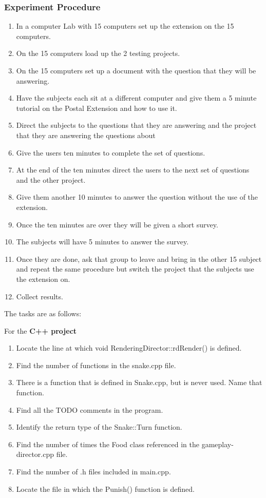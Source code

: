 \documentclass[letterpaper,10pt,titlepage,draftclsnofoot,onecolumn,onesided] {IEEEtran}
\begin{document}
	\subsubsection{Experiment Procedure}
	\begin{enumerate}
		\item	In a computer Lab with 15 computers set up the extension on the 15 computers.
		\item	On the 15 computers load up the 2 testing projects.
		\item	On the 15 computers set up a document with the question that they will be answering.
		\item	Have the subjects each sit at a different computer and give them a 5 minute tutorial on the Postal Extension and how to use it.
		\item	Direct the subjects to the questions that they are answering and the project that they are answering the questions about
		\item	Give the users ten minutes to complete the set of questions.
		\item	At the end of the ten minutes direct the users to the next set of questions and the other project. 
		\item 	Give them another 10 minutes to answer the question without the use of the extension.
		\item	Once the ten minutes are over they will be given a short survey. 
		\item	The subjects will have 5 minutes to answer the survey.
		\item	Once they are done, ask that group to leave and bring in the other 15 subject and repeat the same procedure but switch the project that the subjects use the extension on. 
		\item 	Collect results.
	\end{enumerate}
	
	The tasks are as follows: 
	
	For the \textbf{C++ project}
	\begin{enumerate}
		\item Locate the line at which void RenderingDirector::rdRender() is defined. 
		\item Find the number of functions in the snake.cpp file.
		\item There is a function that is defined in Snake.cpp, but is never used. Name that function.
		\item Find all the TODO comments in the program.
		\item Identify the return type of the Snake::Turn function.
		\item Find the number of times the Food class referenced in the gameplay-director.cpp file.
		\item Find the number of .h files included in main.cpp.
		\item Locate the file in which the Punish() function is defined.
	\end{enumerate}
	
\end{document}
